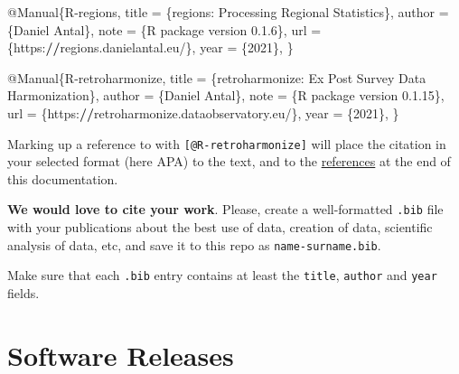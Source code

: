 \documentclass[
  fontsize=13pt,
  english,
  a4paper,
  openany, a4paper, oneside]{book}
\newenvironment{Shaded}{\begin{snugshade}}{\end{snugshade}}
\newcommand{\DecValTok}[1]{\textcolor[rgb]{0.00,0.00,0.81}{#1}}
\newcommand{\ErrorTok}[1]{\textcolor[rgb]{0.64,0.00,0.00}{\textbf{#1}}}
\newcommand{\FloatTok}[1]{\textcolor[rgb]{0.00,0.00,0.81}{#1}}
\newcommand{\NormalTok}[1]{#1}
\newcommand{\OtherTok}[1]{\textcolor[rgb]{0.56,0.35,0.01}{#1}}
\newcommand{\SpecialCharTok}[1]{\textcolor[rgb]{0.00,0.00,0.00}{#1}}
\begin{document}
\begin{Shaded}
\begin{Highlighting}[]
\SpecialCharTok{@}\NormalTok{Manual\{R}\SpecialCharTok{{-}}\NormalTok{regions,}
\NormalTok{  title }\OtherTok{=}\NormalTok{ \{regions}\SpecialCharTok{:}\NormalTok{ Processing Regional Statistics\},}
\NormalTok{  author }\OtherTok{=}\NormalTok{ \{Daniel Antal\},}
\NormalTok{  note }\OtherTok{=}\NormalTok{ \{R package version }\DecValTok{0}\NormalTok{.}\FloatTok{1.6}\NormalTok{\},}
\NormalTok{  url }\OtherTok{=}\NormalTok{ \{https}\SpecialCharTok{:}\ErrorTok{//}\NormalTok{regions.danielantal.eu}\SpecialCharTok{/}\NormalTok{\},}
\NormalTok{  year }\OtherTok{=}\NormalTok{ \{}\DecValTok{2021}\NormalTok{\},}
\NormalTok{\}}

\SpecialCharTok{@}\NormalTok{Manual\{R}\SpecialCharTok{{-}}\NormalTok{retroharmonize,}
\NormalTok{  title }\OtherTok{=}\NormalTok{ \{retroharmonize}\SpecialCharTok{:}\NormalTok{ Ex Post Survey Data Harmonization\},}
\NormalTok{  author }\OtherTok{=}\NormalTok{ \{Daniel Antal\},}
\NormalTok{  note }\OtherTok{=}\NormalTok{ \{R package version }\DecValTok{0}\NormalTok{.}\FloatTok{1.15}\NormalTok{\},}
\NormalTok{  url }\OtherTok{=}\NormalTok{ \{https}\SpecialCharTok{:}\ErrorTok{//}\NormalTok{retroharmonize.dataobservatory.eu}\SpecialCharTok{/}\NormalTok{\},}
\NormalTok{  year }\OtherTok{=}\NormalTok{ \{}\DecValTok{2021}\NormalTok{\},}
\NormalTok{\}}
\end{Highlighting}
\end{Shaded}

Marking up a reference to \citep{R-retroharmonize} with \texttt{{[}@R-retroharmonize{]}} will place the citation in your selected format (here APA) to the text, and to the \protect\hyperlink{references}{references} at the end of this documentation.

\textbf{We would love to cite your work}. Please, create a well-formatted \texttt{.bib} file with your publications about the best use of data, creation of data, scientific analysis of data, etc, and save it to this repo as \texttt{name-surname.bib}.

Make sure that each \texttt{.bib} entry contains at least the \texttt{title}, \texttt{author} and \texttt{year} fields.

\hypertarget{software-releases}{%
\section{Software Releases}\label{software-releases}}
\end{document}
